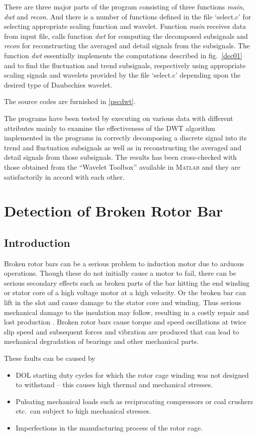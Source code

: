\documentclass[a4paper,11pt]{report}
\begin{document}
There are three major parts of the program consisting of three functions \emph{main}, \emph{dwt} and \emph{recon}. And there is a number of functions defined in the file `select.c' for selecting appropriate scaling function and wavelet. Function \emph{main} receives data from input file, calls function \emph{dwt} for computing the decomposed subsignals and \emph{recon} for reconstructing the averaged and detail signals from the subsignals. The function \emph{dwt} essentially implements the computations described in fig.~\ref{dec01} and  to find the fluctuation and trend subsignals, respectively using appropriate scaling signals and wavelets provided by the file `select.c' depending upon the desired type of Daubechies wavelet.


The source codes are furnished in \ref{pscdwt}.

The programs have been tested by executing on various data with different attributes mainly to examine the effectiveness of the DWT algorithm implemented in the programs in correctly decomposing a discrete signal into its trend and fluctuation subsignals as well as in reconstructing the averaged and detail signals from those subsignals. The results has been cross-checked with those obtained from the ``Wavelet Toolbox'' available in \textsc{Matlab} and they are satisfactorily in accord with each other.


\chapter{Detection of Broken Rotor Bar}
\section{Introduction}
Broken rotor bars can be a serious problem to induction motor due to arduous operations. Though these do not initially cause a motor to fail, there can be serious secondary effects such as broken parts of the bar hitting the end winding or stator core of a high voltage motor at a high velocity. Or the broken bar can lift in the slot and cause damage to the stator core and winding. Thus serious mechanical damage to the insulation may follow, resulting in a costly repair and lost production \cite{t32pg145}. Broken rotor bars cause torque and speed oscillations at twice slip speed and subsequent forces and vibration are produced that can lead to mechanical degradation of bearings and other mechanical parts.

These faults can be caused by
\begin{itemize}
\item DOL starting duty cycles for which the rotor cage winding was not designed to withstand -- this causes high thermal and mechanical stresses. 
\item Pulsating mechanical loads such as reciprocating compressors or coal crushers etc.~can subject to high mechanical stresses.
\item Imperfections in the manufacturing process of the rotor cage.
\end{itemize}
\end{document}
